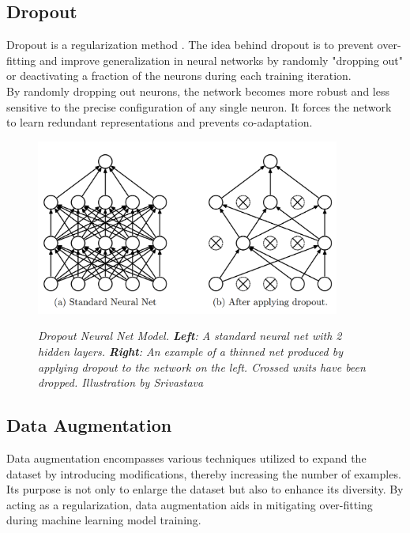 \newpage

\subsection{Dropout}

Dropout is a regularization method \cite{DropoutPaper}. The idea behind dropout
is to prevent over-fitting and improve generalization in neural networks by
randomly "dropping out" or deactivating a fraction of the neurons during
each training iteration. \\

By randomly dropping out neurons, the network becomes more robust and less
sensitive to the precise configuration of any single neuron. It forces the
network to learn redundant representations and prevents co-adaptation.

\begin{figure}[H]
  \centering
  \includegraphics[width=10cm]{imatges/preliminaries/dropout.png}
  \caption[Dropout]{\textit{Dropout Neural Net Model. \textbf{Left}: A standard neural net with 2 hidden layers. \textbf{Right}:
  An example of a thinned net produced by applying dropout to the network on the left.
  Crossed units have been dropped. Illustration by Srivastava}}
  {\label{fig:dropout}}
\end{figure}

\newpage

\subsection{Data Augmentation}

Data augmentation encompasses various techniques utilized to expand the dataset
by introducing modifications, thereby increasing the number of examples. Its
purpose is not only to enlarge the dataset but also to enhance its diversity.
By acting as a regularization, data augmentation aids in mitigating
over-fitting during machine learning model training.

